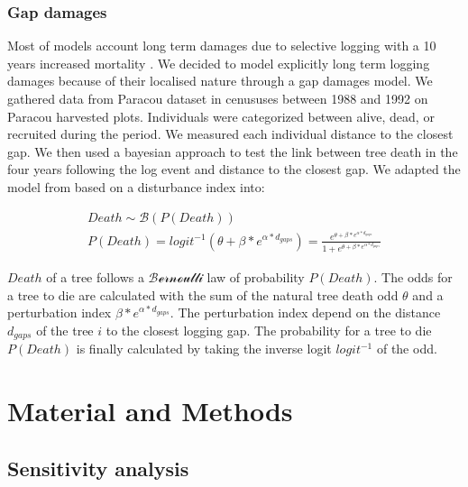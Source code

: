 \documentclass[12pt,]{article}
\let\oldsection\section
\renewcommand\section{\newpage\oldsection}
\theoremstyle{definition}
\theoremstyle{definition}
\theoremstyle{remark}
\begin{document}
\subsubsection{Gap damages}\label{gap-damages}

Most of models account long term damages due to selective logging with a
10 years increased mortality \citep{Huth2004, Khler2004, Ruger2008}. We
decided to model explicitly long term logging damages because of their
localised nature through a gap damages model. We gathered data from
Paracou dataset \citep{Guehl2004} in cenususes between 1988 and 1992 on
Paracou harvested plots. Individuals were categorized between alive,
dead, or recruited during the period. We measured each individual
distance to the closest gap. We then used a bayesian approach to test
the link between tree death in the four years following the log event
and distance to the closest gap. We adapted the model from
\citet{Herault2010} based on a disturbance index into:

\begin{equation}
  \begin{array}{c} 
    Death \sim \mathcal{B}(P(Death)) \\
    P(Death) = logit^{-1}(\theta + \beta*e^{\alpha*d_{gaps}}) = \frac{e^{\theta + \beta*e^{\alpha*d_{gaps}}}}{1 + e^{\theta + \beta*e^{\alpha*d_{gaps}}}}
  \end{array}
  \label{eq:death}
\end{equation}

\(Death\) of a tree follows a \(\mathcal{Bernoulli}\) law of probability
\(P(Death)\). The odds for a tree to die are calculated with the sum of
the natural tree death odd \(\theta\) and a perturbation index
\(\beta*e^{\alpha*d_{gaps}}\). The perturbation index depend on the
distance \(d_{gaps}\) of the tree \(i\) to the closest logging gap. The
probability for a tree to die \(P(Death)\) is finally calculated by
taking the inverse logit \(logit^{-1}\) of the odd.

\section{Material and Methods}\label{material-and-methods}

\subsection{Sensitivity analysis}\label{sensitivity-analysis}
\end{document}
